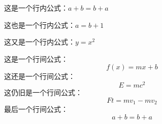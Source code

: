 \documentclass[UTF8, fontset=ubuntu]{ctexart}
\begin{document}
	这是一个行内公式：$a+b=b+a$\par
	这也是一个行内公式：\( a=b+1\)\par
	这又是一个行内公式：\begin{math}y=x^2\end{math}\par
	这是一个行间公式：$$f(x)=mx+b$$
	\indent 这还是一个行间公式：\[E=mc^2\]
	\indent 这仍旧是一个行间公式：\begin{displaymath}Ft=mv_1-mv_2\end{displaymath}
	\indent 最后一个行间公式：\begin{equation}a+b=b+a\end{equation}
\end{document}
